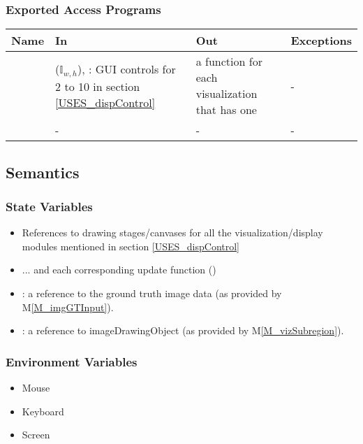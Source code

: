 \documentclass[12pt, titlepage]{article}
\newcommand{\mref}[1]{M\ref{#1}}
\begin{document}
\subsubsection{Exported Access Programs}

\begin{center}
\begin{tabular}{L{3cm} L{5cm} L{4cm} L{2cm}}
\hline
\textbf{Name} & \textbf{In} & \textbf{Out} & \textbf{Exceptions} \\
\hline
{} &  ($\mathbb{I}_{w,h}$),
  : GUI controls for 2 to 10 in section \ref{USES_dispControl}
  & a  function for each visualization that has one & - \\
\hline
{} & - & - & - \\
\hline
\end{tabular}
\end{center}

\subsection{Semantics}

\subsubsection{State Variables}
\begin{itemize}
  \item References to drawing stages/canvases for all the visualization/display modules mentioned
    in section \ref{USES_dispControl}
  \item ... and each corresponding update function () 
  \item {}: a reference to the ground truth image data (as provided by \mref{M_imgGTInput}).
  \item {}: a reference to imageDrawingObject (as provided by \mref{M_vizSubregion}).
\end{itemize}

\subsubsection{Environment Variables}
\begin{itemize}
  \item Mouse
  \item Keyboard
  \item Screen
\end{itemize}
\end{document}
